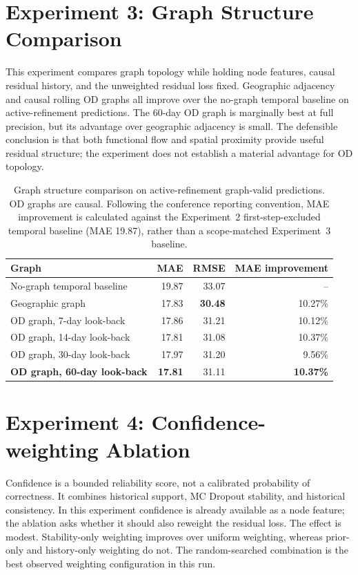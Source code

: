 \documentclass[12pt,a4paper]{report}
\begin{document}
	\section{Experiment 3: Graph Structure Comparison}
	
This experiment compares graph topology while holding node features, causal residual history, and the unweighted residual loss fixed. Geographic adjacency and causal rolling OD graphs all improve over the no-graph temporal baseline on active-refinement predictions. The 60-day OD graph is marginally best at full precision, but its advantage over geographic adjacency is small. The defensible conclusion is that both functional flow and spatial proximity provide useful residual structure; the experiment does not establish a material advantage for OD topology.
	
	\begin{table}[H]
	    \centering
\caption{Graph structure comparison on active-refinement graph-valid predictions. OD graphs are causal. Following the conference reporting convention, MAE improvement is calculated against the Experiment~2 first-step-excluded temporal baseline (MAE 19.87), rather than a scope-matched Experiment~3 baseline.}
	    \label{tab:causal-graph-comparison}
	    \begin{tabular}{lrrr}
	        \toprule
	        Graph & MAE & RMSE & MAE improvement \\
	        \midrule
        No-graph temporal baseline & 19.87 & 33.07 & -- \\
        Geographic graph & 17.83 & \textbf{30.48} & 10.27\% \\
        OD graph, 7-day look-back & 17.86 & 31.21 & 10.12\% \\
        OD graph, 14-day look-back & 17.81 & 31.08 & 10.37\% \\
        OD graph, 30-day look-back & 17.97 & 31.20 & 9.56\% \\
        \textbf{OD graph, 60-day look-back} & \textbf{17.81} & 31.11 & \textbf{10.37\%} \\
	        \bottomrule
	    \end{tabular}
	\end{table}
	
	\section{Experiment 4: Confidence-weighting Ablation}
	
Confidence is a bounded reliability score, not a calibrated probability of correctness. It combines historical support, MC Dropout stability, and historical consistency. In this experiment confidence is already available as a node feature; the ablation asks whether it should also reweight the residual loss. The effect is modest. Stability-only weighting improves over uniform weighting, whereas prior-only and history-only weighting do not. The random-searched combination is the best observed weighting configuration in this run.
	
\end{document}
